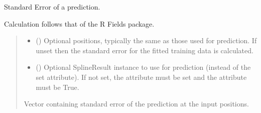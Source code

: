 \documentclass[letterpaper,10pt,english]{sphinxmanual}
\begin{document}
\begin{fulllineitems}
\begin{fulllineitems}
\end{fulllineitems}


\begin{fulllineitems}
\label{\detokenize{splines:glomar_gridding.spline.Spline.standard_error}}
\pysigstartsignatures
\pysiglinewithargsret
{}
{\sphinxparamcomma {}}
{}
\pysigstopsignatures
\sphinxAtStartPar
Standard Error of a prediction.

\sphinxAtStartPar
Calculation follows that of the R Fields package. 
\begin{quote}\begin{description}
\begin{itemize}
\item {}
\sphinxAtStartPar
{} () \textendash{} Optional positions, typically the same as those used for prediction.
If unset then the standard error for the fitted training data is
calculated.

\item {}
\sphinxAtStartPar
{} () \textendash{} Optional SplineResult instance to use for prediction (instead of the
set  attribute). If not set, the  attribute must be
set and the  attribute must be True.

\end{itemize}

\sphinxAtStartPar
Vector containing standard error of the prediction at the input
positions.

\sphinxAtStartPar
{}

\end{description}\end{quote}


\end{fulllineitems}
\end{fulllineitems}
\end{document}
